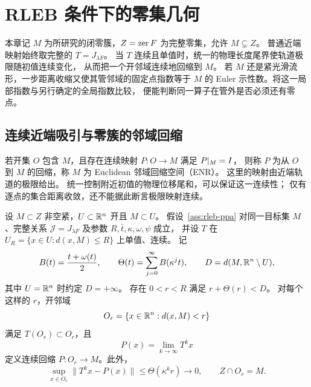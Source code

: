 \section{RLEB 条件下的零集几何}
\label{sec:topological-obstruction}

本章记 $M$ 为所研究的闭零簇，$Z=\operatorname{zer} F$ 为完整零集，允许 $M\subsetneq Z$。
普通近端映射始终取完整的 $T=J_{\lambda F}$。
当 $T$ 连续且单值时，统一的物理长度尾界使轨道极限随初值连续变化，
从而把一个开邻域连续地回缩到 $M$。
若 $M$ 还是紧光滑流形，一步距离收缩又使其管邻域的固定点指数等于
$M$ 的 Euler 示性数。将这一局部指数与另行确定的全局指数比较，
便能判断同一算子在管外是否必须还有零点。

\subsection{连续近端吸引与零簇的邻域回缩}
\label{sec:neighborhood-retraction}

若开集 $O$ 包含 $M$，且存在连续映射 $P:O\to M$ 满足 $P|_M=I$，
则称 $P$ 为从 $O$ 到 $M$ 的回缩，称 $M$ 为 Euclidean 邻域回缩空间（ENR）。
这里的映射由近端轨道的极限给出。
统一控制附近初值的物理位移尾和，可以保证这一连续性；
仅有逐点的集合距离收敛，还不能据此断言极限映射连续。

\begin{theorem}
\label{thm:rleb-neighborhood-retract}
设 $M\subset Z$ 非空紧，$U\subset\mathbb R^n$ 开且 $M\subset U$。
假设~\ref{ass:rleb-ppa} 对同一目标集 $M$、完整关系
$\mathcal J=J_{\lambda F}$ 及参数 $R,\bar t,\kappa,\omega,\psi$ 成立，
并设 $T$ 在 $U_R=\{x\in U:d(x,M)\le R\}$ 上单值、连续。
记
\[
 B(t)=\frac{t+\omega(t)}2,\qquad
 \Theta(t)=\sum_{j=0}^{\infty}B(\kappa^jt),\qquad
 D=d(M,\mathbb R^n\setminus U),
\]
其中 $U=\mathbb R^n$ 时约定 $D=+\infty$。
存在 $0<r<R$ 满足 $r+\Theta(r)<D$。
对每个这样的 $r$，开邻域
\[
 O_r=\{x\in\mathbb R^n:d(x,M)<r\}
\]
满足 $T(O_r)\subset O_r$，且
\[
 P(x)=\lim_{k\to\infty}T^kx
\]
定义连续回缩 $P:O_r\to M$。此外，
\begin{equation}
\label{eq:uniform-retraction-tail}
 \sup_{x\in O_r}\|T^kx-P(x)\|
 \le\Theta(\kappa^kr)\longrightarrow0,
 \qquad Z\cap O_r=M.
\end{equation}
\end{theorem}

